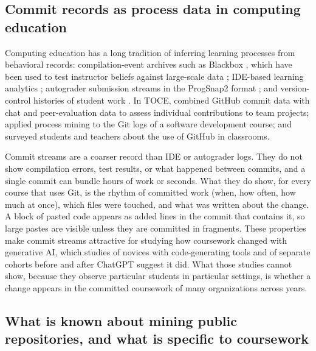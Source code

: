 \documentclass[acmsmall,screen,review,anonymous]{acmart}
\begin{document}
\subsection{Commit records as process data in computing education}

Computing education has a long tradition of inferring learning processes from behavioral records: compilation-event archives such as Blackbox \citep{brown2014blackbox, brown2022novice}, which have been used to test instructor beliefs against large-scale data \citep{brown2017mistakes}; IDE-based learning analytics \citep{hundhausen2017ide}; autograder submission streams in the ProgSnap2 format \citep{price2020progsnap2}; and version-control histories of student work \citep{hundhausen2023github, macak2021process, hsing2019github}. In TOCE, \citet{hundhausen2023github} combined GitHub commit data with chat and peer-evaluation data to assess individual contributions to team projects; \citet{macak2021process} applied process mining to the Git logs of a software development course; and \citet{hsing2019github} surveyed students and teachers about the use of GitHub in classrooms.

Commit streams are a coarser record than IDE or autograder logs. They do not show compilation errors, test results, or what happened between commits, and a single commit can bundle hours of work or seconds. What they do show, for every course that uses Git, is the rhythm of committed work (when, how often, how much at once), which files were touched, and what was written about the change. A block of pasted code appears as added lines in the commit that contains it, so large pastes are visible unless they are committed in fragments. These properties make commit streams attractive for studying how coursework changed with generative AI, which studies of novices with code-generating tools \citep{kazemitabaar2023novices, prather2023weird, prather2024widening} and of separate cohorts before and after ChatGPT \citep{bikangaada2026separate} suggest it did. What those studies cannot show, because they observe particular students in particular settings, is whether a change appears in the committed coursework of many organizations across years.

\subsection{What is known about mining public repositories, and what is specific to coursework}
\end{document}
